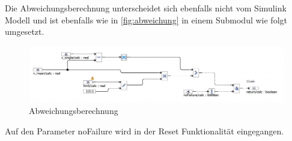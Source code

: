 Die Abweichungsberechnung unterscheidet sich ebenfalls nicht vom Simulink Modell und ist ebenfalls wie in \autoref{fig:abweichung} in einem Submodul wie folgt umgesetzt.
\begin{figure}[H]
	\centering
	\includegraphics[width=\linewidth]{../Graphiken/devCalc}
	\caption{Abweichungsberechnung}
	\label{fig:devCalc}
\end{figure}
Auf den Parameter noFailure wird in der Reset Funktionalität eingegangen.






